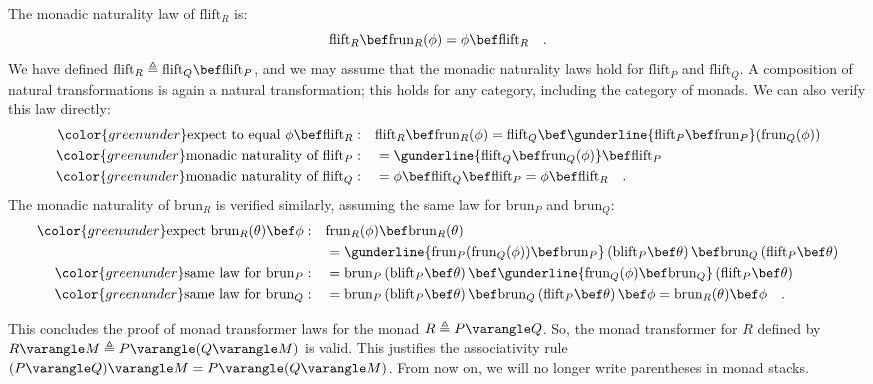 The monadic naturality law of $\text{flift}_{R}$ is:
\[
\text{flift}_{R}\bef\text{frun}_{R}(\phi)=\phi\bef\text{flift}_{R}\quad.
\]
We have defined $\text{flift}_{R}\triangleq\text{flift}_{Q}\bef\text{flift}_{P}$,
and we may assume that the monadic naturality laws hold for $\text{flift}_{P}$
and $\text{flift}_{Q}$. A composition of natural transformations
is again a natural transformation; this holds for any category, including
the category of monads. We can also verify this law directly:
\begin{align*}
{\color{greenunder}\text{expect to equal }\phi\bef\text{flift}_{R}:}\quad & \text{flift}_{R}\bef\text{frun}_{R}(\phi)=\text{flift}_{Q}\bef\gunderline{\text{flift}_{P}\bef\text{frun}_{P}}(\text{frun}_{Q}(\phi))\\
{\color{greenunder}\text{monadic naturality of }\text{flift}_{P}:}\quad & =\gunderline{\text{flift}_{Q}\bef\text{frun}_{Q}(\phi)}\bef\text{flift}_{P}\\
{\color{greenunder}\text{monadic naturality of }\text{flift}_{Q}:}\quad & =\phi\bef\text{flift}_{Q}\bef\text{flift}_{P}=\phi\bef\text{flift}_{R}\quad.
\end{align*}
The monadic naturality of $\text{brun}_{R}$ is verified similarly,
assuming the same law for $\text{brun}_{P}$ and $\text{brun}_{Q}$:
\begin{align*}
{\color{greenunder}\text{expect }\text{brun}_{R}(\theta)\bef\phi:}\quad & \text{frun}_{R}(\phi)\bef\text{brun}_{R}(\theta)\\
 & =\gunderline{\text{frun}_{P}(\text{frun}_{Q}(\phi))\bef\text{brun}_{P}}\left(\text{blift}_{P}\bef\theta\right)\bef\text{brun}_{Q}\left(\text{flift}_{P}\bef\theta\right)\\
{\color{greenunder}\text{same law for }\text{brun}_{P}:}\quad & =\text{brun}_{P}\left(\text{blift}_{P}\bef\theta\right)\bef\gunderline{\text{frun}_{Q}(\phi)\bef\text{brun}_{Q}}\left(\text{flift}_{P}\bef\theta\right)\\
{\color{greenunder}\text{same law for }\text{brun}_{Q}:}\quad & =\text{brun}_{P}\left(\text{blift}_{P}\bef\theta\right)\bef\text{brun}_{Q}\left(\text{flift}_{P}\bef\theta\right)\bef\phi=\text{brun}_{R}(\theta)\bef\phi\quad.
\end{align*}

This concludes the proof of monad transformer laws for the monad $R\triangleq P\varangle Q$.
So, the monad transformer for $R$ defined by $R\varangle M\triangleq P\varangle(Q\varangle M)$
is valid. This justifies the associativity rule $(P\varangle Q)\varangle M=P\varangle(Q\varangle M)$.
From now on, we will no longer write parentheses in monad stacks.

